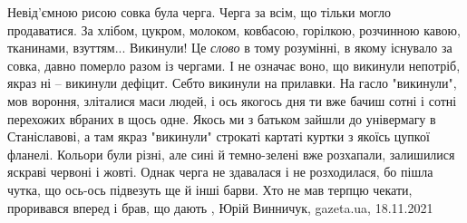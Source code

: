 Невід'ємною рисою совка була черга. Черга за всім, що тільки могло продаватися.
За хлібом, цукром, молоком, ковбасою, горілкою, розчинною кавою, тканинами,
взуттям...  Викинули! Це \emph{слово} в тому розумінні, в якому існувало за
совка, давно померло разом із чергами. І не означає воно, що викинули непотріб,
якраз ні – викинули дефіцит. Себто викинули на прилавки. На гасло "викинули",
мов вороння, зліталися маси людей, і ось якогось дня ти вже бачиш сотні і сотні
перехожих вбраних в щось одне. Якось ми з батьком зайшли до універмагу в
Станіславові, а там якраз "викинули" строкаті картаті куртки з якоїсь цупкої
фланелі. Кольори були різні, але сині й темно-зелені вже розхапали, залишилися
яскраві червоні і жовті. Однак черга не здавалася і не розходилася, бо пішла
чутка, що ось-ось підвезуть ще й інші барви. Хто не мав терпцю чекати,
проривався вперед і брав, що дають
, 
Юрій Винничук, gazeta.ua, 18.11.2021
